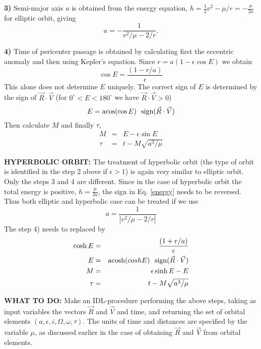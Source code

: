 \documentclass[a4paper,12pt]{article}
\begin{document}
{{{\bf 3)} Semi-major axis $a$ is obtained from the energy equation, $h=\frac{1}{2}v^2-\mu/r = -\frac{\mu}{2a}$ for elliptic orbit, giving
\begin{equation}
 a = -\frac{1}{v^2/\mu - 2/r}.
\label{energy}
\end{equation}

{\bf 4)} Time of pericenter passage is obtained by calculating
first the eccentric anomaly and then using Kepler's equation.
Since $r=a(1-\epsilon \cos E)$ we obtain  
\begin{equation}
\cos E = \frac{(1 - r/a)}{\epsilon}
\end{equation}
\noindent This alone does not determine $E$ uniquely. The correct sign of $E$ is determined by the sign of $\vec R \cdot \vec V$ (for $0^\circ < E < 180^\circ$ we have $\vec R \cdot \vec V>0$)
\begin{equation}
E = {\rm acos}(\cos E) ~~ {\rm sign}(\vec R \cdot \vec V)
\end{equation}
\noindent Then calculate $M$ and finally $\tau$,
\begin{eqnarray}
M &=& E - \epsilon \sin E \\ \nonumber
 \tau &=& t - M \sqrt{a^3/\mu} 
\end{eqnarray}

{\bf HYPERBOLIC ORBIT: } The treatment of hyperbolic orbit (the type
of orbit is identified in the step 2 above if $\epsilon>1$) is again
very similar to elliptic orbit.  Only the steps 3 and 4 are
different. Since in the case of hyperbolic orbit the total energy is
positive, $h=\frac{\mu}{2a}$, the sign in Eq. \ref{energy} needs to be
reversed. Thus both elliptic and hyperbolic case can be treated if we
use
\begin{equation}
 a = \frac{1}{|v^2/\mu - 2/r|}
\end{equation}
The step 4) needs to replaced by
\begin{eqnarray}
\cosh E &=& \frac{(1 + r/a)}{\epsilon} \\ \nonumber
E &=& {\rm acosh}(cosh E)  ~~  {\rm sign}(\vec R \cdot \vec V) \\ \nonumber
M &=& \epsilon \sinh E  -E \\ \nonumber
 \tau &=& t - M \sqrt{a^3/\mu} 
\end{eqnarray}


{\bf WHAT TO DO: } Make an IDL-procedure performing the above steps,
taking as input variables the vectors $\vec R$ and $\vec V$ and time,
and returning the set of orbital elements
$(a,\epsilon,i,\Omega,\omega,\tau)$.  The units of time and distances
are specified by the variable $\mu$, as discussed earlier in the case
of obtaining $\vec R$ and $\vec V$ from orbital elements.

}}
\end{document}
